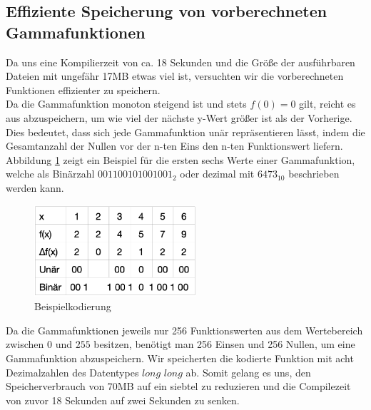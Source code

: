 \documentclass[course=erap]{aspdoc}
\begin{document}
	\subsection{Effiziente Speicherung von vorberechneten Gammafunktionen}
	Da uns eine Kompilierzeit von ca. 18 Sekunden und die Größe der ausführbaren Dateien mit ungefähr 17MB etwas viel ist, versuchten wir die vorberechneten Funktionen effizienter zu speichern.
	\\
	\newline
	\noindent
	Da die Gammafunktion monoton steigend ist und stets $f(0)=0$ gilt, reicht es aus abzuspeichern, um wie viel der nächste y-Wert größer ist als der Vorherige. Dies bedeutet, dass sich jede Gammafunktion unär repräsentieren lässt, indem die Gesamtanzahl der Nullen vor der n-ten Eins den n-ten Funktionswert liefern. Abbildung \ref{KompremierungBeispiel} zeigt ein Beispiel für die ersten sechs Werte einer Gammafunktion, welche als Binärzahl $001100101001001_{2}$ oder dezimal mit $6473_{10}$ beschrieben werden kann.
	
	\noindent
	\begin{figure}
        \includegraphics[width=6cm]{Images/CompressionOfFunctions.png}
         \caption{Beispielkodierung}
         \label{KompremierungBeispiel}
    \end{figure}
	Da die Gammafunktionen jeweils nur 256 Funktionswerten aus dem Wertebereich zwischen $0$ und $255$ besitzen, benötigt man 256 Einsen und 256 Nullen, um eine Gammafunktion abzuspeichern. Wir speicherten die kodierte Funktion mit acht Dezimalzahlen des Datentypes $long$ $long$ ab. Somit gelang es uns, den Speicherverbrauch von 70MB auf ein siebtel zu reduzieren und die Compilezeit von zuvor 18 Sekunden auf zwei Sekunden zu senken. 
\end{document}
